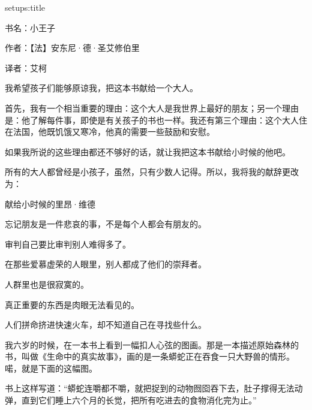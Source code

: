 \usemodule[memos][paperdesign=kindle,hdrstyle=fctext]



\startsetups setups:title
   \setupbackgrounds[page][background=lay:title]
\stopsetups

\setupmakeup[page][before=\setups{setups:title},]
\startmakeup[page]
\stopmakeup

\startfrontmatter
\resetuserpagenumber
\starttitle[title={版权信息}]
书名：小王子

作者：【法】安东尼·德·圣艾修伯里

译者：艾柯
\stoptitle

\starttitle[title={献给------里昂·维德}]

我希望孩子们能够原谅我，把这本书献给一个大人。

首先，我有一个相当重要的理由：这个大人是我世界上最好的朋友；另一个理由是：他了解每件事，即使是有关孩子的书也一样。我还有第三个理由：这个大人住在法国，他既饥饿又寒冷，他真的需要一些鼓励和安慰。

如果我所说的这些理由都还不够好的话，就让我把这本书献给小时候的他吧。

所有的大人都曾经是小孩子，虽然，只有少数人记得。所以，我将我的献辞更改为：

献给小时候的里昂·维德

忘记朋友是一件悲哀的事，不是每个人都会有朋友的。

审判自己要比审判别人难得多了。

在那些爱慕虚荣的人眼里，别人都成了他们的崇拜者。

人群里也是很寂寞的。

真正重要的东西是肉眼无法看见的。

人们拼命挤进快速火车，却不知道自己在寻找些什么。
\stoptitle
\stopfrontmatter

\startbodymatter
\resetuserpagenumber
\starttitle[title={小王子}]
\stoptitle
\starttitle[title={1}]

我六岁的时候，在一本书上看到一幅扣人心弦的图画。那是一本描述原始森林的书，叫做《生命中的真实故事》，画的是一条蟒蛇正在吞食一只大野兽的情形。喏，就是下面的这幅图。

书上这样写道：“蟒蛇连嚼都不嚼，就把捉到的动物囫囵吞下去，肚子撑得无法动弹，直到它们睡上六个月的长觉，把所有吃进去的食物消化完为止。”

